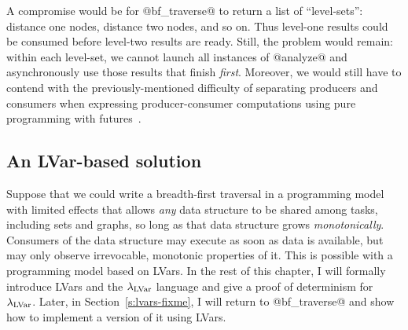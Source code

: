 A compromise would be for @bf_traverse@ to return a list of
``level-sets'': distance one nodes, distance two nodes, and so on.
Thus level-one results could be consumed before level-two results are
ready.  Still, the problem would remain: within each level-set, we
cannot launch all instances of @analyze@ and asynchronously use those
results that finish \emph{first}.  Moreover, we would still have to
contend with the previously-mentioned difficulty of separating
producers and consumers when expressing producer-consumer computations
using pure programming with futures~\cite{monad-par}.

\subsection{An LVar-based solution}

Suppose that we could write a breadth-first traversal in a programming
model with limited effects that allows \emph{any} data structure to be
shared among tasks, including sets and graphs, so long as that data
structure grows \emph{monotonically}.  Consumers of the data structure
may execute as soon as data is available, but may only observe
irrevocable, monotonic properties of it. This is possible with a
programming model based on LVars.  In the rest of this chapter, I will
formally introduce LVars and the $\lambda_{\textrm{LVar}}$ language and give a
proof of determinism for $\lambda_{\textrm{LVar}}$.  Later, in
Section~\ref{s:lvars-fixme}, I will return to @bf_traverse@ and show
how to implement a version of it using LVars. 
